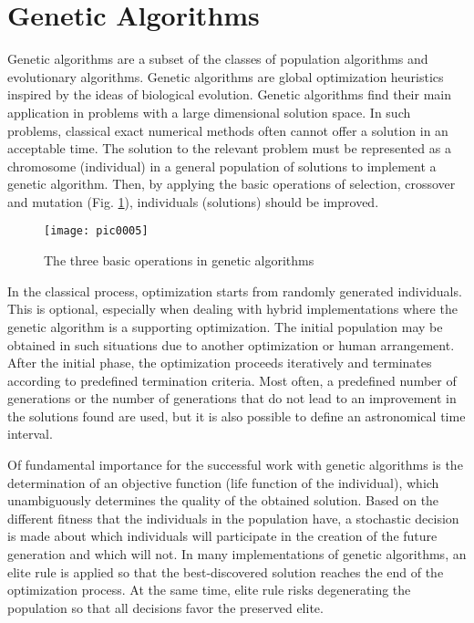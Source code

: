 \section{Genetic Algorithms}

Genetic algorithms are a subset of the classes of population algorithms and evolutionary algorithms. Genetic algorithms are global optimization heuristics inspired by the ideas of biological evolution. Genetic algorithms find their main application in problems with a large dimensional solution space. In such problems, classical exact numerical methods often cannot offer a solution in an acceptable time. The solution to the relevant problem must be represented as a chromosome (individual) in a general population of solutions to implement a genetic algorithm. Then, by applying the basic operations of selection, crossover and mutation (Fig. \ref{fig:pic0005}), individuals (solutions) should be improved.

\begin{figure}[h]
\centering
\texttt{[image: pic0005]}
\caption{The three basic operations in genetic algorithms}
\label{fig:pic0005}
\end{figure}

In the classical process, optimization starts from randomly generated individuals. This is optional, especially when dealing with hybrid implementations where the genetic algorithm is a supporting optimization. The initial population may be obtained in such situations due to another optimization or human arrangement. After the initial phase, the optimization proceeds iteratively and terminates according to predefined termination criteria. Most often, a predefined number of generations or the number of generations that do not lead to an improvement in the solutions found are used, but it is also possible to define an astronomical time interval.

Of fundamental importance for the successful work with genetic algorithms is the determination of an objective function (life function of the individual), which unambiguously determines the quality of the obtained solution. Based on the different fitness that the individuals in the population have, a stochastic decision is made about which individuals will participate in the creation of the future generation and which will not. In many implementations of genetic algorithms, an elite rule is applied so that the best-discovered solution reaches the end of the optimization process. At the same time, elite rule risks degenerating the population so that all decisions favor the preserved elite.

